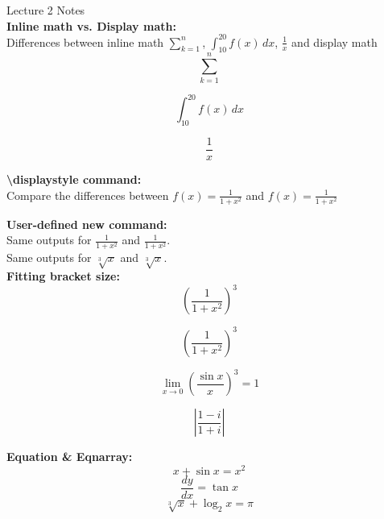 \documentclass{article}
\newcommand{\ds}{\displaystyle}
\newcommand{\crt}{\sqrt[3]}
\begin{document}

{\Large Lecture 2 Notes}\\[1cm] 

\textbf{Inline math vs. Display math:} \\ %

Differences between inline math $\sum_{k=1}^n$, $\int_{10}^{20} f(x)\, dx$, $\frac{1}{x}$
and display math
\[
\sum_{k=1}^n
\]

\[
\int_{10}^{20} f(x)\, dx
\]

\[
\frac{1}{x}
\]

\vspace{1cm}
\textbf{\textbackslash displaystyle command:}\\

Compare the differences between $f(x)=\frac{1}{1+x^2}$ and $f(x)=\displaystyle\frac{1}{1+x^2}$

\vspace{1cm}
\textbf{User-defined new command:}\\

Same outputs for $\ds \frac{1}{1+x^2}$ and $\displaystyle \frac{1}{1+x^2}$.\\

Same outputs for $\crt{x}$ and $\sqrt[3]{x}$.\\


\vspace{1cm}
\textbf{Fitting bracket size:}\\

\[
(\frac{1}{1+x^2})^3 %
\]  

\[
\left(\frac{1}{1+x^2}\right)^3 %
\]

\[
\lim_{x\to 0} \left( \frac{\sin x}{x} \right)^3 = 1 %
\]

\[
\left| 
\frac{1-i}{1+i} %
\right|
\]

\vspace{1cm}
\textbf{Equation \& Eqnarray:}\\ 

\begin{equation}%
x + \sin x = x^2
\end{equation}
\begin{equation}%
\frac{dy}{dx} = \tan x
\end{equation}
\begin{equation}%
\sqrt[3]{x} + \log_2 x = \pi
\end{equation}
\end{document}

